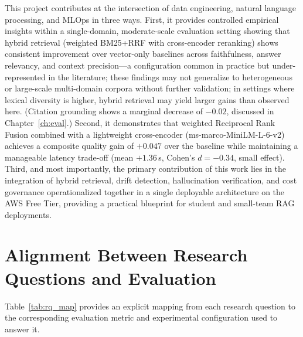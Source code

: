 This project contributes at the intersection of data engineering, natural language processing, and MLOps in three ways. First, it provides controlled empirical insights within a single-domain, moderate-scale evaluation setting showing that hybrid retrieval (weighted BM25+RRF with cross-encoder reranking) shows consistent improvement over vector-only baselines across faithfulness, answer relevancy, and context precision---a configuration common in practice but under-represented in the literature; these findings may not generalize to heterogeneous or large-scale multi-domain corpora without further validation; in settings where lexical diversity is higher, hybrid retrieval may yield larger gains than observed here. (Citation grounding shows a marginal decrease of $-0.02$, discussed in Chapter~\ref{ch:eval}.) Second, it demonstrates that weighted Reciprocal Rank Fusion combined with a lightweight cross-encoder (ms-marco-MiniLM-L-6-v2) achieves a composite quality gain of $+0.047$ over the baseline while maintaining a manageable latency trade-off (mean $+1.36$\,s, Cohen's $d = -0.34$, small effect). Third, and most importantly, the primary contribution of this work lies in the integration of hybrid retrieval, drift detection, hallucination verification, and cost governance operationalized together in a single deployable architecture on the AWS Free Tier, providing a practical blueprint for student and small-team RAG deployments.

\section{Alignment Between Research Questions and Evaluation}
\label{sec:rq_eval_map}

Table~\ref{tab:rq_map} provides an explicit mapping from each research question to the corresponding evaluation metric and experimental configuration used to answer it.

